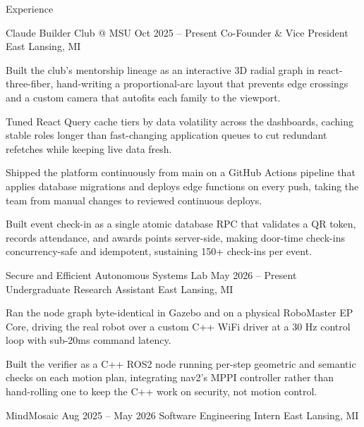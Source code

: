\documentclass[
	11pt
]{../../../template}
\begin{document}
	\begin{rSection}{E}{xperience}
		\begin{rSectionEntry}
			{Claude Builder Club @ MSU}
			{Oct 2025 -- Present}
			{Co-Founder \& Vice President}
			{}
			{East Lansing, MI}

			\item Built the club's mentorship lineage as an interactive 3D radial graph in react-three-fiber, hand-writing a proportional-arc layout that prevents edge crossings and a custom camera that autofits each family to the viewport.
			\item Tuned React Query cache tiers by data volatility across the dashboards, caching stable roles longer than fast-changing application queues to cut redundant refetches while keeping live data fresh.
			\item Shipped the platform continuously from main on a GitHub Actions pipeline that applies database migrations and deploys edge functions on every push, taking the team from manual changes to reviewed continuous deploys.
			\item Built event check-in as a single atomic database RPC that validates a QR token, records attendance, and awards points server-side, making door-time check-ins concurrency-safe and idempotent, sustaining 150+ check-ins per event.
		\end{rSectionEntry}

		\begin{rSectionEntry}
			{Secure and Efficient Autonomous Systems Lab}
			{May 2026 -- Present}
			{Undergraduate Research Assistant}
			{}
			{East Lansing, MI}

			\item Ran the node graph byte-identical in Gazebo and on a physical RoboMaster EP Core, driving the real robot over a custom C++ WiFi driver at a 30 Hz control loop with sub-20ms command latency.
			\item Built the verifier as a C++ ROS2 node running per-step geometric and semantic checks on each motion plan, integrating nav2's MPPI controller rather than hand-rolling one to keep the C++ work on security, not motion control.
		\end{rSectionEntry}

		\begin{rSectionEntry}
			{MindMosaic}
			{Aug 2025 -- May 2026}
			{Software Engineering Intern}
			{}
			{East Lansing, MI}


\end{rSectionEntry}
\end{rSection}
\end{document}
